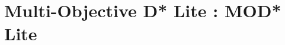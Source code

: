 \documentclass[10pt,journal]{IEEEtran}
\begin{document}
%
%

\section{Multi-Objective D*  Lite : MOD* Lite}
\label{chapter:proposedAlgorithm}
\end{document}
